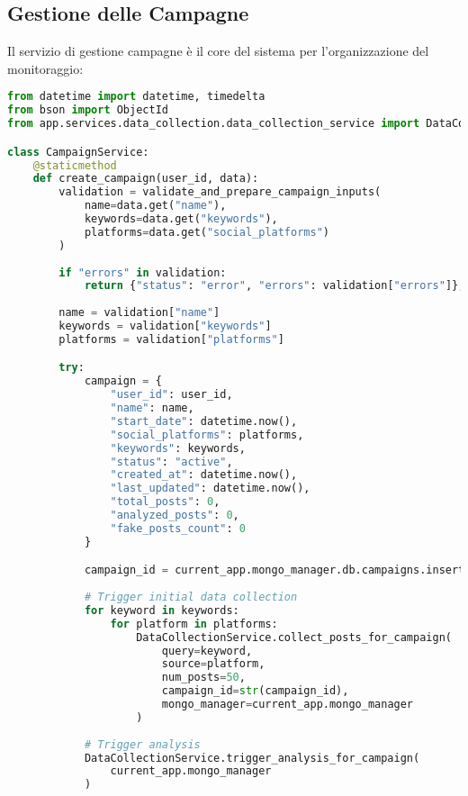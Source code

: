 \documentclass[12pt,a4paper]{report}
\begin{document}
\subsection{Gestione delle Campagne}

Il servizio di gestione campagne è il core del sistema per l'organizzazione del monitoraggio:

\begin{lstlisting}[language=Python, caption=Campaign Service - Create Campaign]
from datetime import datetime, timedelta
from bson import ObjectId
from app.services.data_collection.data_collection_service import DataCollectionService

class CampaignService:
    @staticmethod
    def create_campaign(user_id, data):
        validation = validate_and_prepare_campaign_inputs(
            name=data.get("name"),
            keywords=data.get("keywords"),
            platforms=data.get("social_platforms")
        )
        
        if "errors" in validation:
            return {"status": "error", "errors": validation["errors"]}, 400
        
        name = validation["name"]
        keywords = validation["keywords"]
        platforms = validation["platforms"]

        try:
            campaign = {
                "user_id": user_id,
                "name": name,
                "start_date": datetime.now(),
                "social_platforms": platforms,
                "keywords": keywords,
                "status": "active",
                "created_at": datetime.now(),
                "last_updated": datetime.now(),
                "total_posts": 0,
                "analyzed_posts": 0,
                "fake_posts_count": 0
            }

            campaign_id = current_app.mongo_manager.db.campaigns.insert_one(campaign).inserted_id
            
            # Trigger initial data collection
            for keyword in keywords:
                for platform in platforms:
                    DataCollectionService.collect_posts_for_campaign(
                        query=keyword,
                        source=platform,
                        num_posts=50,
                        campaign_id=str(campaign_id),
                        mongo_manager=current_app.mongo_manager
                    )
            
            # Trigger analysis
            DataCollectionService.trigger_analysis_for_campaign(
                current_app.mongo_manager
            )


\end{lstlisting}
\end{document}
